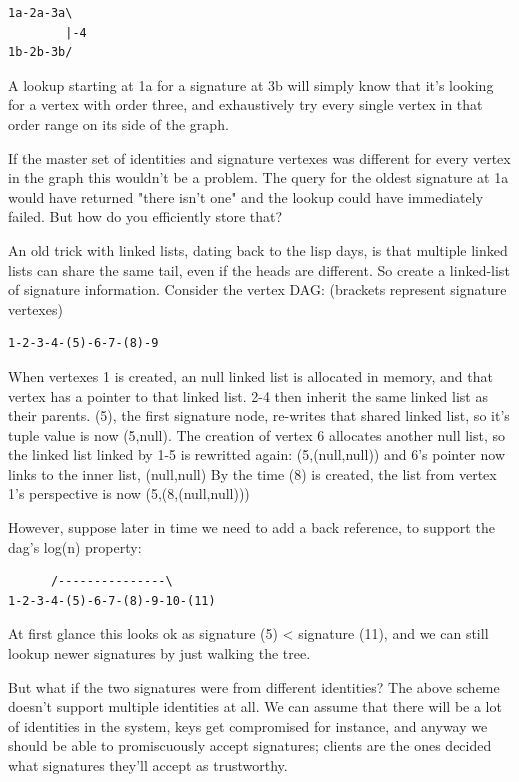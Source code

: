 \documentclass{article}
\begin{document}
\begin{verbatim}
1a-2a-3a\
        |-4
1b-2b-3b/
\end{verbatim}

A lookup starting at 1a for a signature at 3b will simply know that it's
looking for a vertex with order three, and exhaustively try every single
vertex in that order range on its side of the graph.


If the master set of identities and signature vertexes was different for
every vertex in the graph this wouldn't be a problem. The query for the
oldest signature at 1a would have returned "there isn't one" and the
lookup could have immediately failed. But how do you efficiently store
that?

An old trick with linked lists, dating back to the lisp days, is that
multiple linked lists can share the same tail, even if the heads are
different. So create a linked-list of signature information. Consider
the vertex DAG: (brackets represent signature vertexes)

\begin{verbatim}
1-2-3-4-(5)-6-7-(8)-9
\end{verbatim}

When vertexes 1 is created, an null linked list is allocated in memory,
and that vertex has a pointer to that linked list. 2-4 then inherit the
same linked list as their parents. (5), the first signature node,
re-writes that shared linked list, so it's tuple value is now (5,null).
The creation of vertex 6 allocates another null list, so the linked list
linked by 1-5 is rewritted again: (5,(null,null)) and 6's pointer now
links to the inner list, (null,null) By the time (8) is created, the
list from vertex 1's perspective is now (5,(8,(null,null)))

However, suppose later in time we need to add a back reference, to
support the dag's log(n) property:

\begin{verbatim}
      /---------------\
1-2-3-4-(5)-6-7-(8)-9-10-(11)
\end{verbatim}

At first glance this looks ok as signature (5) < signature (11), and we
can still lookup newer signatures by just walking the tree.

But what if the two signatures were from different identities? The above
scheme doesn't support multiple identities at all. We can assume that
there will be a lot of identities in the system, keys get compromised
for instance, and anyway we should be able to promiscuously accept
signatures; clients are the ones decided what signatures they'll accept
as trustworthy.
\end{document}

